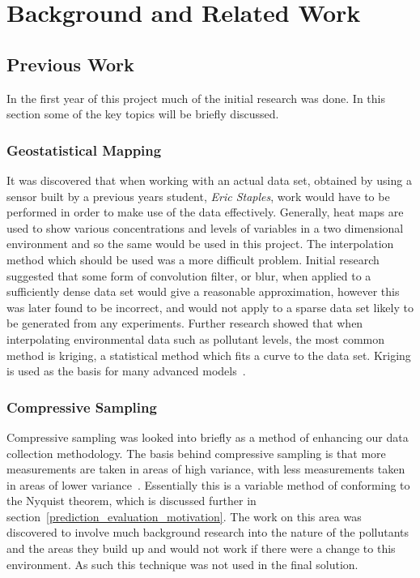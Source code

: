 \chapter{Background and Related Work}\label{background}




\section{Previous Work}\label{background_previous_work}


    In the first year of this project much of the initial research was done. In this section some of the key topics will be briefly discussed.

    

    \subsection{Geostatistical Mapping}
    
        It was discovered that when working with an actual data set, obtained by using a sensor built by a previous years student, \emph{Eric Staples}, work would have to be performed in order to make use of the data effectively. Generally, heat maps are used to show various concentrations and levels of variables in a two dimensional environment and so the same would be used in this project. The interpolation method which should be used was a more difficult problem. Initial research suggested that some form of convolution filter, or blur, when applied to a sufficiently dense data set would give a reasonable approximation, however this was later found to be incorrect, and would not apply to a sparse data set likely to be generated from any experiments. Further research showed that when interpolating environmental data such as pollutant levels, the most common method is kriging, a statistical method which fits a curve to the data set. Kriging is used as the basis for many advanced models~\cite{regressionkriging}.

    \subsection{Compressive Sampling}

        Compressive sampling was looked into briefly as a method of enhancing our data collection methodology. The basis behind compressive sampling is that more measurements are taken in areas of high variance, with less measurements taken in areas of lower variance~\cite{compressivesampling}. Essentially this is a variable method of conforming to the Nyquist theorem, which is discussed further in section~\ref{prediction_evaluation_motivation}. The work on this area was discovered to involve much background research into the nature of the pollutants and the areas they build up and would not work if there were a change to this environment. As such this technique was not used in the final solution.

